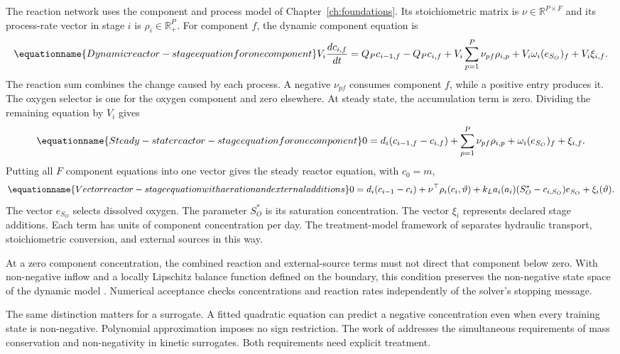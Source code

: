 The reaction network uses the component and process model of Chapter~\ref{ch:foundations}. Its stoichiometric matrix is $\nu\in\mathbb R^{P\times F}$ and its process-rate vector in stage $i$ is $\rho_i\in\mathbb R_+^P$. For component $f$, the dynamic component equation is
\begin{equation}
\equationname{Dynamic reactor-stage equation for one component}
V_i\frac{dc_{i,f}}{dt}=Q_Pc_{i-1,f}-Q_Pc_{i,f}
+V_i\sum_{p=1}^{P}\nu_{pf}\rho_{i,p}+V_i\omega_i(e_{S_O})_f+V_i\xi_{i,f}.
\end{equation}
The reaction sum combines the change caused by each process. A negative $\nu_{pf}$ consumes component $f$, while a positive entry produces it. The oxygen selector is one for the oxygen component and zero elsewhere. At steady state, the accumulation term is zero. Dividing the remaining equation by $V_i$ gives
\begin{equation}
\equationname{Steady-state reactor-stage equation for one component}
0=d_i(c_{i-1,f}-c_{i,f})+\sum_{p=1}^{P}\nu_{pf}\rho_{i,p}
+\omega_i(e_{S_O})_f+\xi_{i,f}.
\end{equation}
Putting all $F$ component equations into one vector gives the steady reactor equation, with $c_0=m$,
\begin{equation}
\equationname{Vector reactor-stage equation with aeration and external additions}
0=d_i(c_{i-1}-c_i)+\nu^\top\rho_i(c_i,\vartheta)
+k_La_i(a_i)(S_O^*-c_{i,S_O})e_{S_O}+\xi_i(\vartheta).
\label{eq:plant_reactor}
\end{equation}
The vector $e_{S_O}$ selects dissolved oxygen. The parameter $S_O^*$ is its saturation concentration. The vector $\xi_i$ represents declared stage additions. Each term has units of component concentration per day. The treatment-model framework of \citet{Henze2006} separates hydraulic transport, stoichiometric conversion, and external sources in this way.

At a zero component concentration, the combined reaction and external-source terms must not direct that component below zero. With non-negative inflow and a locally Lipschitz balance function defined on the boundary, this condition preserves the non-negative state space of the dynamic model \citep{Haddad2010}. Numerical acceptance checks concentrations and reaction rates independently of the solver's stopping message.

The same distinction matters for a surrogate. A fitted quadratic equation can predict a negative concentration even when every training state is non-negative. Polynomial approximation imposes no sign restriction. The work of \citet{KircherVotsmeier2025} addresses the simultaneous requirements of mass conservation and non-negativity in kinetic surrogates. Both requirements need explicit treatment.

